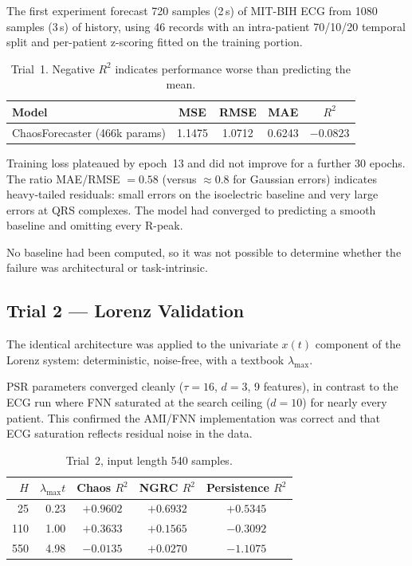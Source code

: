 \documentclass[11pt,a4paper]{article}
\begin{document}
The first experiment forecast 720 samples (2\,s) of MIT-BIH ECG from 1080 samples (3\,s) of history, using 46 records with an intra-patient 70/10/20 temporal split and per-patient z-scoring fitted on the training portion.

\begin{table}[H]
\centering
\caption{Trial~1. Negative $R^2$ indicates performance worse than predicting the mean.}
\begin{tabular}{lcccc}
\toprule
\textbf{Model} & \textbf{MSE} & \textbf{RMSE} & \textbf{MAE} & $R^2$ \\
\midrule
ChaosForecaster (466k params) & 1.1475 & 1.0712 & 0.6243 & $-0.0823$ \\
\bottomrule
\end{tabular}
\end{table}

Training loss plateaued by epoch~13 and did not improve for a further 30 epochs.
The ratio MAE/RMSE $= 0.58$ (versus $\approx 0.8$ for Gaussian errors) indicates heavy-tailed residuals: small errors on the isoelectric baseline and very large errors at QRS complexes.
The model had converged to predicting a smooth baseline and omitting every R-peak.

No baseline had been computed, so it was not possible to determine whether the failure was architectural or task-intrinsic.


\subsection{Trial 2 --- Lorenz Validation}

The identical architecture was applied to the univariate $x(t)$ component of the Lorenz system: deterministic, noise-free, with a textbook $\lambda_{\max}$.

PSR parameters converged cleanly ($\tau = 16$, $d = 3$, 9 features), in contrast to the ECG run where FNN saturated at the search ceiling ($d = 10$) for nearly every patient.
This confirmed the AMI/FNN implementation was correct and that ECG saturation reflects residual noise in the data.

\begin{table}[H]
\centering
\caption{Trial~2, input length 540 samples.}
\begin{tabular}{rr|c|c|c}
\toprule
$H$ & $\lambda_{\max} t$ & Chaos $R^2$ & NGRC $R^2$ & Persistence $R^2$ \\
\midrule
25  & 0.23 & $+0.9602$ & $+0.6932$ & $+0.5345$ \\
110 & 1.00 & $+0.3633$ & $+0.1565$ & $-0.3092$ \\
550 & 4.98 & $-0.0135$ & $+0.0270$ & $-1.1075$ \\
\bottomrule
\end{tabular}
\end{table}
\end{document}
